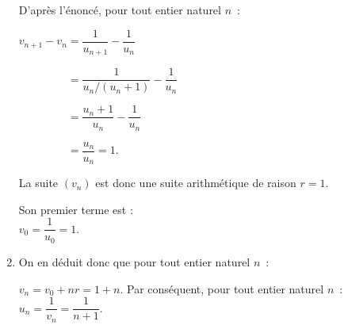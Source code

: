 \begin{corrige}
\begin{enumerate}
          \par
          D'après l'énoncé, pour tout entier naturel $n$~:
          \par
          $v_{n+1} -v_n = \dfrac{1}{u_{n+1}} - \dfrac{1}{u_n}$\par
          $\phantom{v_{n+1} -v_n} = \dfrac{1}{u_n/(u_n+1)} - \dfrac{1}{u_n}$\par
          $\phantom{v_{n+1} -v_n} = \dfrac{u_n+1}{u_n} - \dfrac{1}{u_n}$\par
          $\phantom{v_{n+1} -v_n} = \dfrac{u_n}{u_n} = 1.$
          \par
          La suite  $(v_n)$ est donc une suite arithmétique de raison $r=1$.
          \par
          Son premier terme est : \\
          $v_0=\dfrac{1}{u_0}=1.$
          \item %
          On en déduit donc que pour tout entier naturel $n$~:
          \par
          $v_n=v_0+nr=1+n.$
          \medbreak
          Par conséquent, pour tout entier naturel $n$~:
          $u_n=\dfrac{1}{v_n}=\dfrac{1}{n+1}.$
     \end{enumerate}
\end{corrige}
